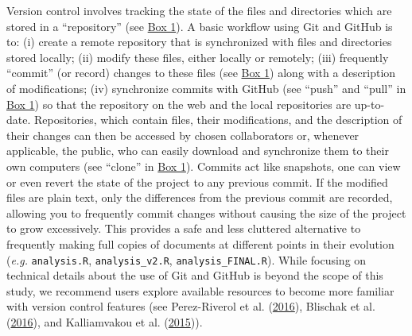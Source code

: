 Version control involves tracking the state of the files and directories which are stored in a ``repository'' (see \protect\hyperlink{definitions}{Box 1}).
A basic workflow using Git and GitHub is to: (i) create a remote repository that is synchronized with files and directories stored locally; (ii) modify these files, either locally or remotely; (iii) frequently ``commit'' (or record) changes to these files (see \protect\hyperlink{definitions}{Box 1}) along with a description of modifications; (iv) synchronize commits with GitHub (see ``push'' and ``pull'' in \protect\hyperlink{definitions}{Box 1}) so that the repository on the web and the local repositories are up-to-date.
Repositories, which contain files, their modifications, and the description of their changes can then be accessed by chosen collaborators or, whenever applicable, the public, who can easily download and synchronize them to their own computers (see ``clone'' in \protect\hyperlink{definitions}{Box 1}).
Commits act like snapshots, one can view or even revert the state of the project to any previous commit.
If the modified files are plain text, only the differences from the previous commit are recorded, allowing you to frequently commit changes without causing the size of the project to grow excessively.
This provides a safe and less cluttered alternative to frequently making full copies of documents at different points in their evolution (\emph{e.g.} \texttt{analysis.R}, \texttt{analysis\_v2.R}, \texttt{analysis\_FINAL.R}).
While focusing on technical details about the use of Git and GitHub is beyond the scope of this study, we recommend users explore available resources to become more familiar with version control features (see Perez-Riverol et al. (\protect\hyperlink{ref-kEX5dgzK}{2016}), Blischak et al. (\protect\hyperlink{ref-PlcxShQU}{2016}), and Kalliamvakou et al. (\protect\hyperlink{ref-ndfO9H}{2015})).

